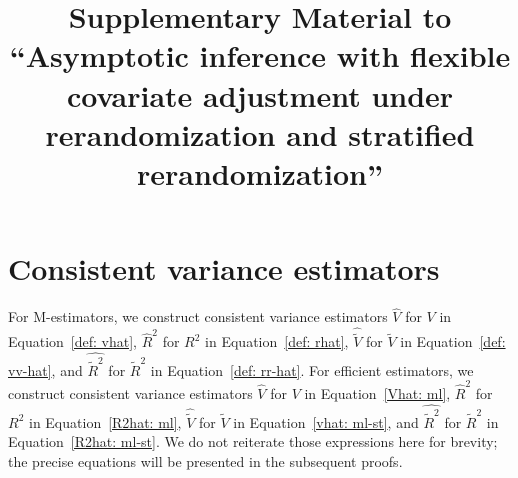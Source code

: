 \documentclass[12pt]{article}
\title{Supplementary Material to ``Asymptotic inference with flexible covariate adjustment under rerandomization and stratified rerandomization''}
\author{}
\begin{document}
\def\spacingset#1{\renewcommand{\baselinestretch}%
{#1}\small\normalsize} \spacingset{1}

\date{\vspace{-5ex}}

\maketitle

\spacingset{1.8}
\appendix

\section{Consistent variance estimators}
For M-estimators, we construct consistent variance estimators $\widehat{V}$ for $V$ in Equation~\eqref{def: vhat}, $\widehat{R}^2$ for $R^2$ in Equation~\eqref{def: rhat}, $\widehat{\widetilde{V}}$ for $\widetilde{V}$ in Equation~\eqref{def: vv-hat}, and  $\widehat{\widetilde{R}^2}$ for $\widetilde{R}^2$ in Equation~\eqref{def: rr-hat}. 
For efficient estimators, we construct consistent variance estimators $\widehat{V}$ for $V$ in Equation~\eqref{Vhat: ml}, $\widehat{R}^2$ for $R^2$ in Equation~\eqref{R2hat: ml}, $\widehat{\widetilde{V}}$ for $\widetilde{V}$ in Equation~\eqref{vhat: ml-st}, and  $\widehat{\widetilde{R}^2}$ for $\widetilde{R}^2$ in Equation~\eqref{R2hat: ml-st}. 
We do not reiterate those expressions here for brevity; the precise equations will be presented in the subsequent proofs.
\end{document}
